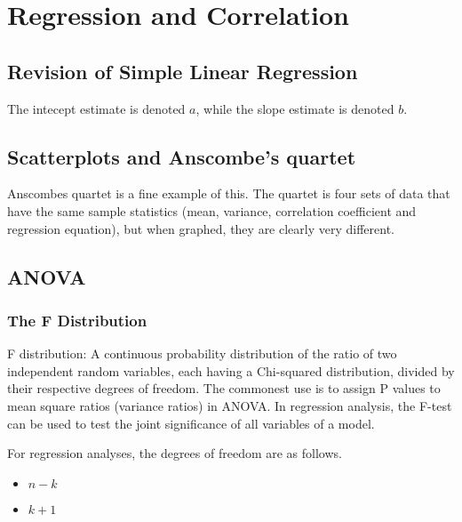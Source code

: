 \documentclass[12pt, a4paper]{report}
\begin{document}
\newpage
\chapter{Regression and Correlation}
\section{Revision of Simple Linear Regression}

The intecept estimate is denoted $a$, while the slope estimate is denoted $b$.


\section{Scatterplots and Anscombe's quartet}
Anscombes quartet is a fine example of this. The quartet is four sets of data that have the same sample statistics (mean, variance, correlation coefficient and regression equation), but when graphed, they are clearly very different.

\newpage

\newpage
\section{ANOVA}
\subsection{The F Distribution}
F distribution: A continuous probability distribution of the ratio of two independent random variables, each having a Chi-squared distribution, divided by their respective degrees of freedom. The commonest use is to assign P values to mean square ratios (variance ratios) in ANOVA. In regression analysis, the F-test can be used to test the joint significance of all variables of a model.


For regression analyses, the degrees of freedom are as follows.
\begin{itemize}
\item $n-k$
\item $k+1$
\end{itemize}
\end{document}
